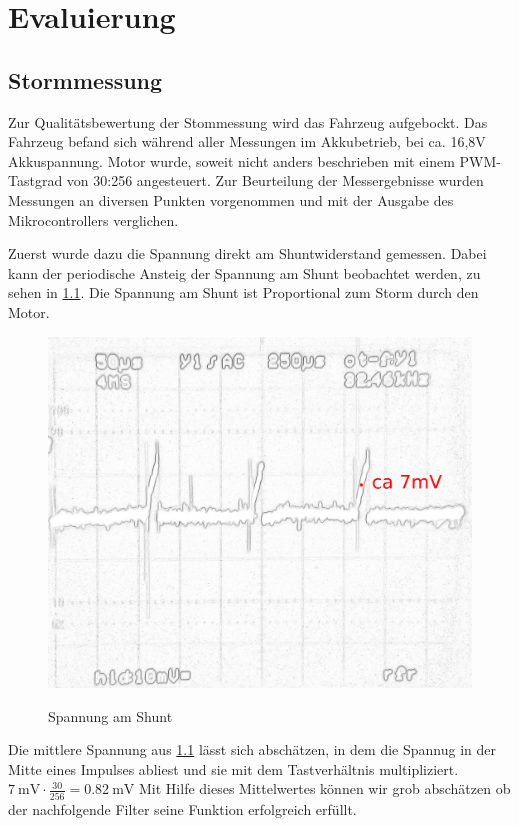 \chapter{Evaluierung}



\section{Stormmessung}

Zur Qualitätsbewertung der Stommessung wird das Fahrzeug aufgebockt. 
Das Fahrzeug befand sich während aller Messungen im Akkubetrieb, bei ca. 16,8V Akkuspannung.
Motor wurde, soweit nicht anders beschrieben mit einem PWM-Tastgrad von 30:256 angesteuert.
Zur Beurteilung der Messergebnisse wurden Messungen an diversen Punkten vorgenommen und mit der Ausgabe des Mikrocontrollers verglichen.

Zuerst wurde dazu die Spannung direkt am Shuntwiderstand gemessen.
Dabei kann der periodische Ansteig der Spannung am Shunt beobachtet werden, zu sehen in \cref{fig:filter_eingang}. Die Spannung am Shunt ist Proportional zum Storm durch den Motor.

\begin{figure}[H]
\centering
\includegraphics[width=.8\textwidth]{filter_eingang_mak.png}\\
\caption{Spannung am Shunt}%
\label{fig:filter_eingang}
\end{figure}

Die mittlere Spannung aus \cref{fig:filter_eingang} lässt sich abschätzen, in dem die Spannug in der Mitte eines Impulses abliest und sie mit dem Tastverhältnis multipliziert.
$\SI{7}{\mV}\cdot\frac{30}{256}=\SI{0,82}{\mV} $
Mit Hilfe dieses Mittelwertes können wir grob abschätzen ob der nachfolgende Filter seine Funktion erfolgreich erfüllt.


